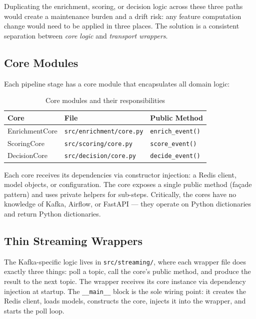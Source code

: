 Duplicating the enrichment, scoring, or decision logic across these three paths
would create a maintenance burden and a drift risk: any feature computation
change would need to be applied in three places. The solution is a consistent
separation between \emph{core logic} and \emph{transport wrappers}.

\subsection{Core Modules}

Each pipeline stage has a core module that encapsulates all domain logic:

\begin{table}[H]
\centering
\caption{Core modules and their responsibilities}
\label{tab:core-modules}
\begin{tabular}{@{}lll@{}}
\toprule
\textbf{Core} & \textbf{File} & \textbf{Public Method} \\
\midrule
EnrichmentCore & \texttt{src/enrichment/core.py} & \texttt{enrich\_event()} \\
ScoringCore    & \texttt{src/scoring/core.py}     & \texttt{score\_event()} \\
DecisionCore   & \texttt{src/decision/core.py}    & \texttt{decide\_event()} \\
\bottomrule
\end{tabular}
\end{table}

Each core receives its dependencies via constructor injection: a Redis client,
model objects, or configuration. The core exposes a single public method
(fa\c{c}ade pattern) and uses private helpers for sub-steps. Critically, the
cores have no knowledge of Kafka, Airflow, or FastAPI --- they operate on
Python dictionaries and return Python dictionaries.

\subsection{Thin Streaming Wrappers}

The Kafka-specific logic lives in \texttt{src/streaming/}, where each wrapper
file does exactly three things: poll a topic, call the core's public method,
and produce the result to the next topic. The wrapper receives its core
instance via dependency injection at startup. The \texttt{\_\_main\_\_} block
is the sole wiring point: it creates the Redis client, loads models, constructs
the core, injects it into the wrapper, and starts the poll loop.

